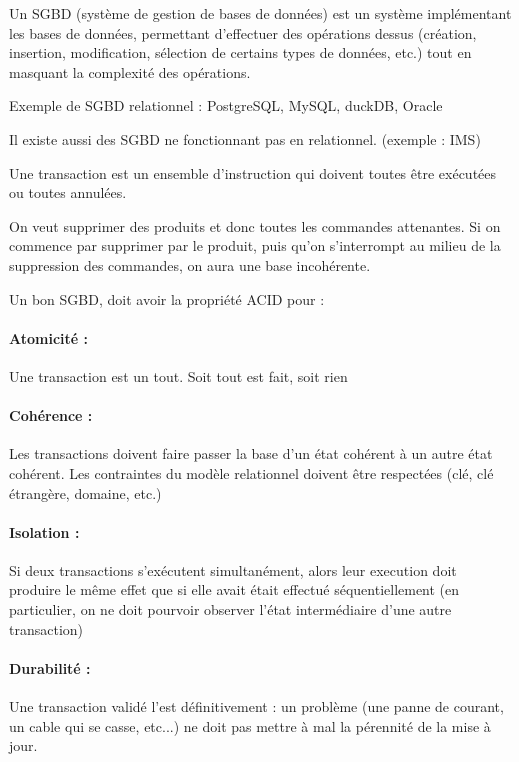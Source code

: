 \begin{definition}
	Un SGBD (système de gestion de bases de données) est un système implémentant les bases de données, permettant d'effectuer des opérations dessus (création, insertion, modification, sélection de certains types de données, etc.) tout en masquant la complexité des opérations.
\end{definition}

\begin{example}
	Exemple de SGBD relationnel : PostgreSQL, MySQL, duckDB, Oracle
\end{example}

\begin{rem}
	Il existe aussi des SGBD ne fonctionnant pas en relationnel. (exemple : IMS)
\end{rem}

\begin{definition}
	 Une transaction est un ensemble d'instruction qui doivent toutes être exécutées ou toutes annulées.
\end{definition}

\begin{example}
	On veut supprimer des produits et donc toutes les commandes attenantes. Si on commence par supprimer par le produit, puis qu'on s'interrompt au milieu de la suppression des commandes,  on aura une base incohérente.
\end{example}

\begin{proposition}
	 Un bon SGBD, doit avoir la propriété ACID pour :
	
	\paragraph{Atomicité :} Une transaction est un tout. Soit tout est fait, soit rien
	
	\paragraph{Cohérence :} Les transactions doivent faire passer la base d'un état cohérent à un autre état cohérent. Les contraintes du modèle relationnel doivent être respectées (clé, clé étrangère, domaine, etc.)
	
	\paragraph{Isolation :} Si deux transactions s'exécutent simultanément, alors leur execution doit produire le même effet que si elle avait était effectué séquentiellement (en particulier, on ne doit pourvoir observer l'état intermédiaire d'une autre transaction)
	
	\paragraph{Durabilité :} Une transaction validé l'est définitivement : un problème (une panne de courant, un cable qui se casse, etc...) ne doit pas mettre à mal la pérennité de la mise à jour.
\end{proposition}

